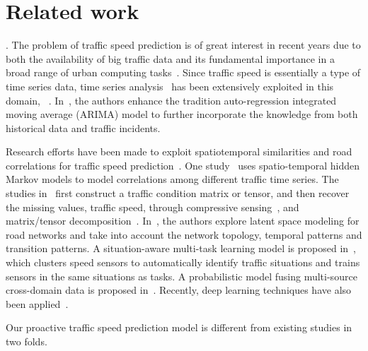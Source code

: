 \section{Related work}
\label{sec-related}


. The problem of traffic speed prediction is of great interest in recent years due to both the availability of big traffic data and its fundamental importance in a broad range of urban computing tasks~\cite{Zheng2014TIST}.
%
Since traffic speed is essentially a type of time series data, time series analysis~\cite{time-series-book} has been extensively exploited in this domain, \eg~\cite{traffic2011TRP,TS2012ICDM,HMM2013VLDB,MTL2017ICDM}. In~\cite{TS2012ICDM}, the authors enhance the tradition auto-regression integrated moving average (ARIMA) model to further incorporate the knowledge from both historical data and traffic incidents.

Research efforts have been made to exploit spatiotemporal similarities and road correlations for traffic speed prediction~\cite{Zhu2013TMC,Shang2014KDD,Wang2014KDD,LSM2016KDD,MTL2017ICDM,HMM2013VLDB}.
%
One study~\cite{HMM2013VLDB} uses spatio-temporal hidden Markov models to model correlations among different traffic time series.
%
The studies in~\cite{Zhu2013TMC,Shang2014KDD,Wang2014KDD} first construct a traffic condition matrix or tensor, and then recover the missing values, \ie traffic speed, through compressive sensing~\cite{Zhu2013TMC}, and matrix/tensor decomposition~\cite{Shang2014KDD,Wang2014KDD}.
%
In~\cite{LSM2016KDD}, the authors explore latent space modeling for road networks and take into account the network topology, temporal patterns and transition patterns.
%
A situation-aware multi-task learning model is proposed in~\cite{MTL2017ICDM}, which clusters speed sensors to automatically identify traffic situations and trains sensors in the same situations as tasks.
%
A probabilistic model fusing multi-source cross-domain data is proposed in~\cite{Lu2017Speed}.
Recently, deep learning techniques have also been applied~\cite{DL2016ICDM,DL2017SDM}. %

Our proactive traffic speed prediction model is different from existing studies in two folds.

